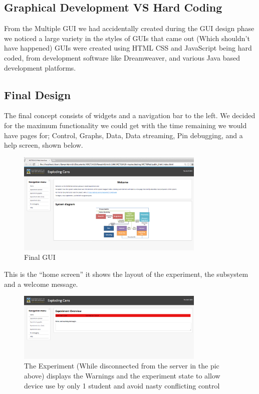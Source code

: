 \subsection{Graphical Development VS Hard Coding}

From the Multiple GUI we had accidentally created during the GUI design phase we noticed a large variety in the styles of GUIs that came out (Which shouldn't have happened) GUIs were created using HTML CSS and JavaScript being hard coded, from development software like Dreamweaver, and various Java based development platforms. 

\subsection{Final Design}

The final concept consists of widgets and a navigation bar to the left. We decided for the maximum functionality we could get with the time remaining we would have pages for; Control, Graphs, Data, Data streaming,  Pin debugging, and a help screen, shown below.

\begin{figure}[H]
	\centering
	\includegraphics[width=0.8\textwidth]{figures/gui_final.png}
	\caption{Final GUI} 
\end{figure}

This is the ``home screen'' it shows the layout of the experiment, the subsystem and a welcome message.

\begin{figure}[H]
	\centering
	\includegraphics[width=0.8\textwidth]{figures/gui_experiment.png}
	\caption{The Experiment (While disconnected from the server in the pic above) displays the Warnings and the experiment state to allow device use by only 1 student and avoid nasty conflicting control} 
\end{figure}

